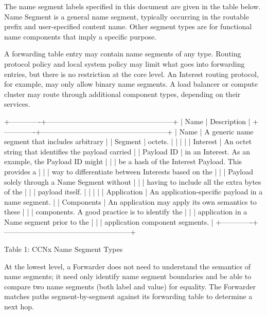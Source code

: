 \documentclass[12pt]{article}
\begin{document}
The name segment labels specified in this document are given in the
table below.  Name Segment is a general name segment, typically
occurring in the routable prefix and user-specified content name.
Other segment types are for functional name components that imply a
specific purpose.

A forwarding table entry may contain name segments of any type.
Routing protocol policy and local system policy may limit what goes
into forwarding entries, but there is no restriction at the core
level.  An Interest routing protocol, for example, may only allow
binary name segments.  A load balancer or compute cluster may route
through additional component types, depending on their services.

+-------------+-----------------------------------------------------+
|     Name    | Description                                         |
+-------------+-----------------------------------------------------+
|     Name    | A generic name segment that includes arbitrary      |
|   Segment   | octets.                                             |
|             |                                                     |
|   Interest  | An octet string that identifies the payload carried |
|  Payload ID | in an Interest. As an example, the Payload ID might |
|             | be a hash of the Interest Payload.  This provides a |
|             | way to differentiate between Interests based on the |
|             | Payload solely through a Name Segment without       |
|             | having to include all the extra bytes of the        |
|             | payload itself.                                     |
|             |                                                     |
| Application | An application-specific payload in a name segment.  |
|  Components | An application may apply its own semantics to these |
|             | components.  A good practice is to identify the     |
|             | application in a Name segment prior to the          |
|             | application component segments.                     |
+-------------+-----------------------------------------------------+

                 Table 1: CCNx Name Segment Types

At the lowest level, a Forwarder does not need to understand the
semantics of name segments; it need only identify name segment
boundaries and be able to compare two name segments (both label and
value) for equality.  The Forwarder matches paths segment-by-segment
against its forwarding table to determine a next hop.
\end{document}
